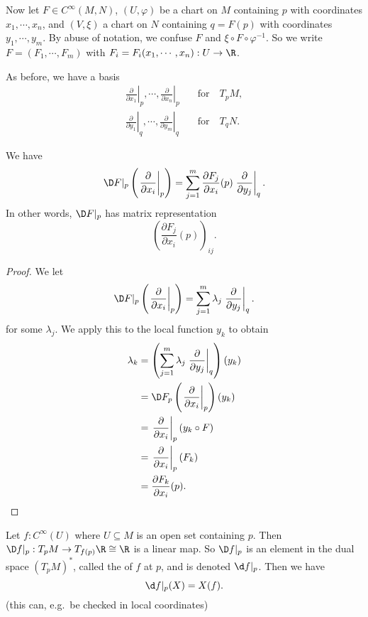 \documentclass[a4paper]{article}
\begin{document}
Now let $F \in C^\infty(M, N)$, $(U, \varphi)$ be a chart on $M$ containing $p$ with coordinates $x_1, \cdots, x_n$, and $(V, \xi)$ a chart on $N$ containing $q = F(p)$ with coordinates $y_1,\cdots, y_m$. By abuse of notation, we confuse $F$ and $\xi \circ F \circ \varphi^{-1}$. So we write $F = (F_1, \cdots, F_m)$ with $F_i = F_i(x_1, \cdots, x_n): U \to \R$.

As before, we have a basis
\begin{align*}
  \left.\frac{\partial}{\partial x_1}\right|_p, \cdots, \left.\frac{\partial}{\partial x_n}\right|_p&\quad\text{for}\quad T_pM,\\
  \left.\frac{\partial}{\partial y_1}\right|_q, \cdots, \left.\frac{\partial}{\partial y_m}\right|_q&\quad\text{for}\quad T_qN.
\end{align*}

\begin{lemma}
  We have
  \[
    \D F|_p \left(\left.\frac{\partial}{\partial x_i}\right|_p\right) = \sum_{j = 1}^m \frac{\partial F_j}{\partial x_i}(p) \left.\frac{\partial}{\partial y_j}\right|_q.
  \]
  In other words, $\D F|_p$ has matrix representation
  \[
    \left(\frac{\partial F_j}{\partial x_i}(p)\right)_{ij}.
  \]
\end{lemma}

\begin{proof}
  We let
  \[
    \D F|_p \left(\left.\frac{\partial}{\partial x_i}\right|_p\right) = \sum_{j = 1}^m \lambda_j \left.\frac{\partial}{\partial y_j}\right|_q.
  \]
  for some $\lambda_j$. We apply this to the local function $y_k$ to obtain
  \begin{align*}
    \lambda_k &= \left(\sum_{j = 1}^m \lambda_j \left.\frac{\partial}{\partial y_j}\right|_q\right)(y_k)\\
    &= \D F_p \left(\left.\frac{\partial}{\partial x_i}\right|_p\right)(y_k)\\
    &= \left.\frac{\partial}{\partial x_i}\right|_p (y_k \circ F) \\
    &= \left.\frac{\partial}{\partial x_i}\right|_p(F_k) \\
    &= \frac{\partial F_k}{\partial x_i}(p). \qedhere
  \end{align*}
\end{proof}

\begin{eg}
  Let $f: C^\infty(U)$ where $U \subseteq M$ is an open set containing $p$. Then $\D f|_p: T_p M \to T_{f(p)} \R \cong \R$ is a linear map. So $\D f|_p$ is an element in the dual space $(T_pM)^*$, called the  of $f$ at $p$, and is denoted $\d f|_p$. Then we have
  \[
    \d f|_p(X) = X(f).
  \]
  (this can, e.g.\ be checked in local coordinates)
\end{eg}
\end{document}
